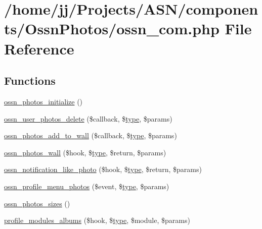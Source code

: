 \hypertarget{_ossn_photos_2ossn__com_8php}{}\section{/home/jj/\+Projects/\+A\+S\+N/components/\+Ossn\+Photos/ossn\+\_\+com.php File Reference}
\label{_ossn_photos_2ossn__com_8php}
\subsection*{Functions}
\begin{DoxyCompactItemize}
\item 
\hyperlink{_ossn_photos_2ossn__com_8php_a10f3d3896165536ce4d785f028622e4a}{ossn\+\_\+photos\+\_\+initialize} ()
\item 
\hyperlink{_ossn_photos_2ossn__com_8php_a7754d84ed48c67deb08d41ddc4cf5eda}{ossn\+\_\+user\+\_\+photos\+\_\+delete} (\$callback, \$\hyperlink{_ossn_wall_2actions_2wall_2post_2group_8php_a2dc1bb4e1ed0029daa81ac0776b14b51}{type}, \$params)
\item 
\hyperlink{_ossn_photos_2ossn__com_8php_affc70bda2bb368020a300c3f206652d5}{ossn\+\_\+photos\+\_\+add\+\_\+to\+\_\+wall} (\$callback, \$\hyperlink{_ossn_wall_2actions_2wall_2post_2group_8php_a2dc1bb4e1ed0029daa81ac0776b14b51}{type}, \$params)
\item 
\hyperlink{_ossn_photos_2ossn__com_8php_ae0cf20515371b0aa013a53c7e83b50f6}{ossn\+\_\+photos\+\_\+wall} (\$hook, \$\hyperlink{_ossn_wall_2actions_2wall_2post_2group_8php_a2dc1bb4e1ed0029daa81ac0776b14b51}{type}, \$return, \$params)
\item 
\hyperlink{_ossn_photos_2ossn__com_8php_afbc77f44d00a687a6a16e7b4596dc526}{ossn\+\_\+notification\+\_\+like\+\_\+photo} (\$hook, \$\hyperlink{_ossn_wall_2actions_2wall_2post_2group_8php_a2dc1bb4e1ed0029daa81ac0776b14b51}{type}, \$return, \$params)
\item 
\hyperlink{_ossn_photos_2ossn__com_8php_aedd81d16204b52f7e645a97dd0701267}{ossn\+\_\+profile\+\_\+menu\+\_\+photos} (\$event, \$\hyperlink{_ossn_wall_2actions_2wall_2post_2group_8php_a2dc1bb4e1ed0029daa81ac0776b14b51}{type}, \$params)
\item 
\hyperlink{_ossn_photos_2ossn__com_8php_a521c17e46915f5e1d6c86f9d202f81e8}{ossn\+\_\+photos\+\_\+sizes} ()
\item 
\hyperlink{_ossn_photos_2ossn__com_8php_a106d462542fbdc17ba19aab5285da4c7}{profile\+\_\+modules\+\_\+albums} (\$hook, \$\hyperlink{_ossn_wall_2actions_2wall_2post_2group_8php_a2dc1bb4e1ed0029daa81ac0776b14b51}{type}, \$module, \$params)

\end{DoxyCompactItemize}
